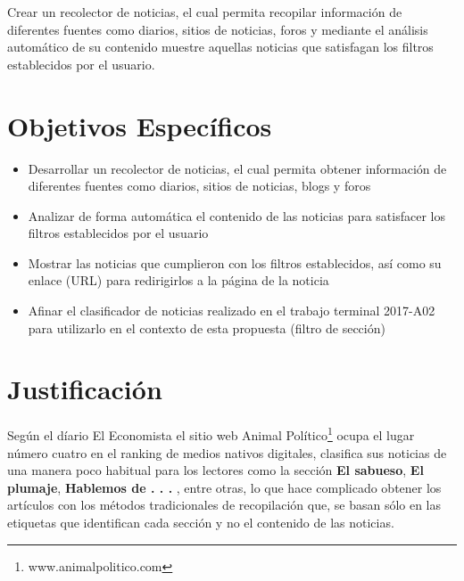   Crear un recolector de noticias, el cual permita recopilar información de diferentes fuentes como diarios, sitios de noticias, foros y mediante el 
  análisis automático de su contenido muestre aquellas noticias que satisfagan los filtros establecidos por el usuario.



\section{Objetivos Específicos}

\begin{itemize}

  \item Desarrollar un recolector de noticias, el cual permita obtener información de diferentes fuentes como diarios, sitios de noticias, blogs y foros
  \item Analizar de forma automática el contenido de las noticias para satisfacer los filtros establecidos por el usuario
  \item Mostrar las noticias que cumplieron con los filtros establecidos, así como su enlace (URL) para redirigirlos a la página de la noticia
  \item Afinar el clasificador de noticias realizado en el trabajo terminal 2017-A02 para utilizarlo en el contexto de esta propuesta (filtro de sección) 

\end{itemize}
\section{Justificación}


Según el díario El Economista \citep{SU1} el sitio web Animal Político\footnote{www.animalpolitico.com}
ocupa el lugar número cuatro en el ranking de medios nativos digitales, clasifica sus noticias de una manera poco habitual para los lectores como la sección
\textbf{El sabueso}, \textbf{El plumaje}, \textbf{Hablemos de . . . }, entre otras, lo que hace complicado obtener los artículos con los métodos tradicionales 
de recopilación que, se basan sólo en las etiquetas que identifican cada sección y no el contenido de las noticias.

